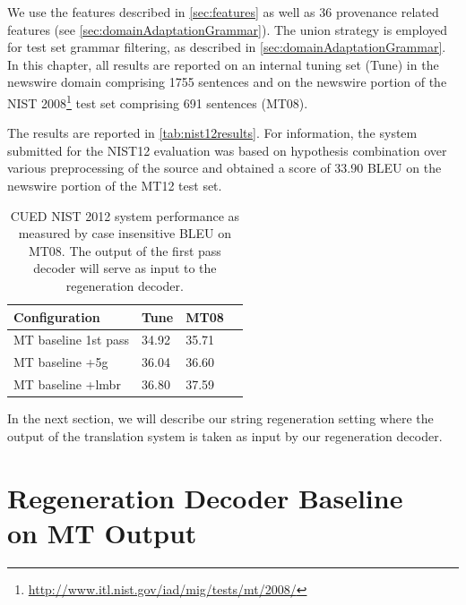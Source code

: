 We use the features described in \autoref{sec:features}
as well as 36 provenance related features (see \autoref{sec:domainAdaptationGrammar}).
The union
strategy is employed for test set grammar filtering, as described
in \autoref{sec:domainAdaptationGrammar}.
In this chapter, all results are reported on an internal tuning set (Tune)
in the newswire domain comprising
1755 sentences and on the newswire portion of the NIST
2008\footnote{\url{http://www.itl.nist.gov/iad/mig/tests/mt/2008/}} test
set comprising 691 sentences (MT08).

The results are reported in \autoref{tab:nist12results}.
For information, the system submitted for the NIST12 evaluation was based
on hypothesis combination over various preprocessing of the source and obtained
a score of 33.90 BLEU on the newswire portion of the MT12 test set.
%
\begin{table}
  \begin{center}
    \begin{tabular}{l|lll}
      Configuration   & Tune & MT08 \\
      \hline
      MT baseline 1st pass & 34.92 & 35.71 \\
      MT baseline +5g      & 36.04 & 36.60 \\
      MT baseline +lmbr    & 36.80 & 37.59 \\
    \end{tabular}
    \caption{CUED NIST 2012 system performance as measured by case insensitive BLEU on MT08. The output of the
      first pass decoder will serve as input to the regeneration decoder.}
    \label{tab:nist12results}
  \end{center}
\end{table}

In the next section, we will describe our string regeneration setting where
the output of the translation system is taken as input by our
regeneration decoder.

\section[Regeneration Decoder Baseline on MT Output]{Regeneration Decoder Baseline \\ on MT Output}
\label{sec:gyroTransBaseline}


